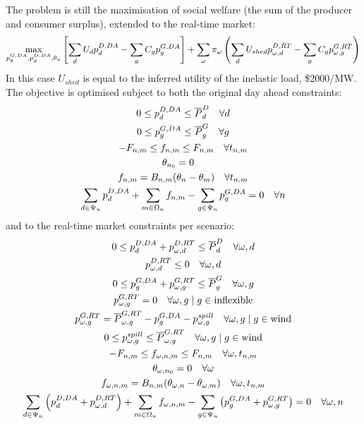 \documentclass[11pt,a4paper]{article}
\numberwithin{equation}{section}
\begin{document}
The problem is still the maximisation of social welfare (the sum of the producer and consumer surplus), extended to the real-time market:
\begin{equation}
\max_{p^{G,DA}_g,p^{D,DA}_d,\theta_n} \left[ \sum_d U_d p^{D,DA}_d - \sum_g C_g p^{G,DA}_g \right] + 
\sum_\omega \pi_\omega \left( \sum_d U_{shed} p^{D,RT}_{\omega,d} - \sum_g C_g p^{G,RT}_{\omega,g} \right)
\end{equation}
In this case $U_{shed}$ is equal to the inferred utility of the inelastic load, \$2000/MW. The objective is optimised subject to both the original day ahead constraints:
\begin{gather}
0 \leq p^{D,DA}_d \leq \overline{P}^D_d \quad \forall d \label{eq:da_demand} \\
0 \leq p^{G,DA}_g \leq \overline{P}^G_g \quad \forall g \label{eq:da_supply} \\
-F_{n,m}  \leq f_{n,m} \leq F_{n,m} \quad \forall t_{n,m} \label{eq:da_trans}\\
\theta_{n_0} = 0 \quad \label{eq:prim_ref_theta} \\
f_{n,m} = B_{n,m}(\theta_n - \theta_m) \quad \forall t_{n,m} \label{eq:da_flow} \\
\sum_{d \in \Psi_n} p^{D,DA}_d + \sum_{m \in \Omega_n} f_{n,m} - \sum_{g \in \Psi_n} p^{G,DA}_g = 0 \quad \forall n \label{eq:da_balance}
\end{gather}
and to the real-time market constraints per scenario:
\begin{gather}
0 \leq p^{D,DA}_d + p^{D,RT}_{\omega,d} \leq \overline{P}^D_d \quad \forall \omega, d \label{eq:rt_demand} \\
p^{D,RT}_{\omega,d} \leq 0 \quad \forall \omega, d \\
0 \leq p^{G,DA}_g + p^{G,RT}_{\omega,g} \leq \overline{P}^G_g \quad \forall \omega, g \label{eq:rt_supply} \\
p^{G,RT}_{\omega,g} = 0 \quad \forall \omega, g \mid g \in \text{inflexible} \\
p^{G,RT}_{\omega,g} = \overline{P}^{G,RT}_{\omega,g} - p^{G,DA}_g - p^{spill}_{\omega,g}  \quad \forall \omega, g \mid g \in \text{wind} \label{eq:rt_wind} \\
0  \leq p^{spill}_{\omega,g} \leq \overline{P}^{G,RT}_{\omega,g} \quad \forall \omega, g \mid g \in \text{wind} \\
-F_{n,m}  \leq f_{\omega,n,m} \leq F_{n,m} \quad \forall \omega, t_{n,m} \label{eq:rt_trans}\\
\theta_{\omega, n_0} = 0 \quad \forall \omega \label{eq:prim_ref_theta} \\
f_{\omega,n,m} = B_{n,m}(\theta_{\omega, n} - \theta_{\omega, m}) \quad \forall \omega, t_{n,m} \label{eq:rt_flow} \\
\sum_{d \in \Psi_n} \left( p^{D,DA}_d + p^{D,RT}_{\omega,d} \right) + \sum_{m \in \Omega_n} f_{\omega,n,m} 
- \sum_{g \in \Psi_n} \left( p^{G,DA}_g + p^{G,RT}_{\omega,g} \right) = 0 \quad \forall \omega, n \label{eq:rt_balance}
\end{gather}
\end{document}
